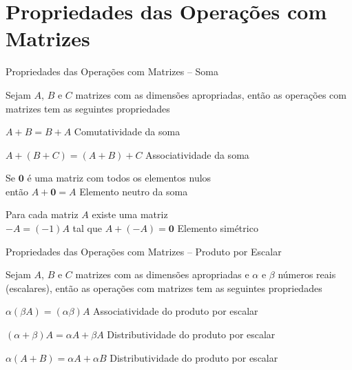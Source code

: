 \section{Propriedades das Operações com Matrizes}

\begin{teoria}{Propriedades das Operações com Matrizes -- Soma}
    
    Sejam $A$, $B$ e $C$ matrizes com as dimensões apropriadas, 
    então as operações com matrizes tem as seguintes propriedades
    \begin{propriedades}
        \item $A+B = B+A$                              \tabto{8cm} Comutatividade da soma
        \item $A+(B+C) = (A+B)+C$                      \tabto{8cm} Associatividade da soma
        \item Se $\mathbf{0}$ é uma matriz com todos os elementos nulos \\ então
              $A+\mathbf{0}=A$                         \tabto{8cm} Elemento neutro da soma
        \item Para cada matriz $A$ existe uma matriz \\ $-A=(-1)A$ tal que
              $A+(-A)=\mathbf{0}$                      \tabto{8cm} Elemento simétrico
    \end{propriedades}
    
\end{teoria}

\begin{teoria}{Propriedades das Operações com Matrizes -- Produto por Escalar}
    
    Sejam $A$, $B$ e $C$ matrizes com as dimensões apropriadas e $\alpha$ e $\beta$ números reais (escalares), 
    então as operações com matrizes tem as seguintes propriedades
    \begin{propriedades}
        \item $\alpha(\beta A)=(\alpha\beta)A$         \tabto{8cm} Associatividade do produto por escalar
        \item $(\alpha+\beta)A= \alpha A + \beta A$    \tabto{8cm} Distributividade do produto por escalar
        \item $\alpha(A+B)=\alpha A+\alpha B$          \tabto{8cm} Distributividade do produto por escalar
    \end{propriedades}
    
\end{teoria}

